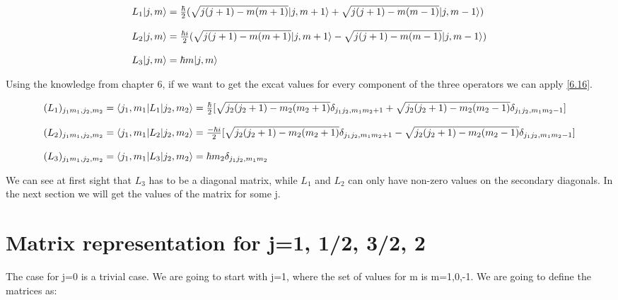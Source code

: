 \begin{equation*}
  \label{9.43}
  \begin{array}{l}
    L_1 \lvert j,m\rangle = \frac{\hbar}{2}(\sqrt{j(j+1) - m(m+1)}\lvert j,m+1\rangle + \sqrt{j(j+1) - m(m-1)}\lvert j,m-1\rangle)
    \\

    \\
    L_2 \lvert j,m\rangle = \frac{\hbar i}{2}(\sqrt{j(j+1) - m(m+1)}\lvert j,m+1\rangle - \sqrt{j(j+1) - m(m-1)}\lvert j,m-1\rangle)
    \\

    \\
    L_3 \lvert j,m\rangle = \hbar m \lvert j,m\rangle
  \end{array}
\end{equation*}

Using the knowledge from chapter 6, if we want to get the excat values for every component of the three operators we can apply \ref{6.16}.


\begin{equation*}
  \begin{array}{l}
    (L_1)_{j_1m_1,j_2,m_2} = \langle j_1,m_1\rvert L_1\lvert j_2,m_2\rangle = \frac{\hbar}{2}[\sqrt{j_2(j_2+1)-m_2(m_2+1)}\delta_{j_1j_2,m_1m_2+1} + \sqrt{j_2(j_2+1)-m_2(m_2-1)}\delta_{j_1j_2,m_1m_2-1}]
    \\

    \\
    (L_2)_{j_1m_1,j_2,m_2} = \langle j_1,m_1\rvert L_2\lvert j_2,m_2\rangle = \frac{-\hbar i}{2}[\sqrt{j_2(j_2+1)-m_2(m_2+1)}\delta_{j_1j_2,m_1m_2+1} - \sqrt{j_2(j_2+1)-m_2(m_2-1)}\delta_{j_1j_2,m_1m_2-1}]
    \\

    \\
    (L_3)_{j_1m_1,j_2,m_2} = \langle j_1,m_1\rvert L_3\lvert j_2,m_2\rangle = \hbar m_2 \delta_{j_1j_2,m_1m_2}
  \end{array}
\end{equation*}

We can see at first sight that $L_3$ has to be a diagonal matrix, while $L_1$ and $L_2$ can only have non-zero values on the secondary diagonals. In the next section we will get the values of the matrix for some j.


\section{Matrix representation for j={1, 1/2, 3/2, 2}}


The case for j=0 is a trivial case. We are going to start with j=1, where the set of values for m is m={1,0,-1}. We are going to define the matrices as:

